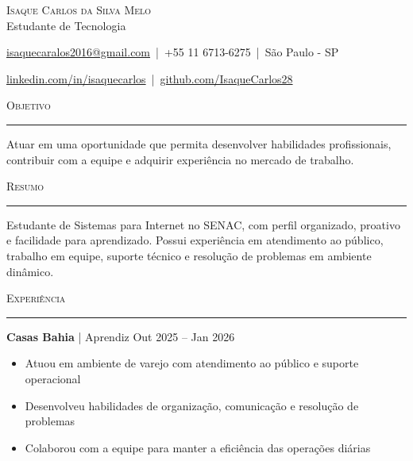 \documentclass[a4paper]{article}
\newcommand{\header}[1]{
    \vspace{4mm}
    {\large\textsc{#1}}
    
    \vspace{1mm}
    \hrule
    
    \vspace{2mm}
}
\begin{document}

\begin{center}
    {\Huge \scshape Isaque Carlos da Silva Melo}\\
    \vspace{4pt}
    {\Large Estudante de Tecnologia}
\end{center}

\vspace{3mm}

\href{mailto:isaquecarlos2016@gmail.com}{isaquecaralos2016@gmail.com}
\,|\, 
+55 11 6713-6275
\,|\, 
São Paulo - SP

\vspace{0.5mm}

\href{https://linkedin.com/in/isaquecarlos}{linkedin.com/in/isaquecarlos}
\,|\, 
\href{https://github.com/IsaqueCarlos28}{github.com/IsaqueCarlos28}


\header{Objetivo}

Atuar em uma oportunidade que permita desenvolver habilidades profissionais, contribuir com a equipe e adquirir experiência no mercado de trabalho.


\header{Resumo}

Estudante de Sistemas para Internet no SENAC, com perfil organizado, proativo e facilidade para aprendizado. Possui experiência em atendimento ao público, trabalho em equipe, suporte técnico e resolução de problemas em ambiente dinâmico.


\header{Experiência}

\textbf{Casas Bahia} | Aprendiz
\hfill Out 2025 -- Jan 2026

\begin{itemize}[leftmargin=*, itemsep=1pt]
    \item Atuou em ambiente de varejo com atendimento ao público e suporte operacional
    \item Desenvolveu habilidades de organização, comunicação e resolução de problemas
    \item Colaborou com a equipe para manter a eficiência das operações diárias
\end{itemize}
\end{document}

